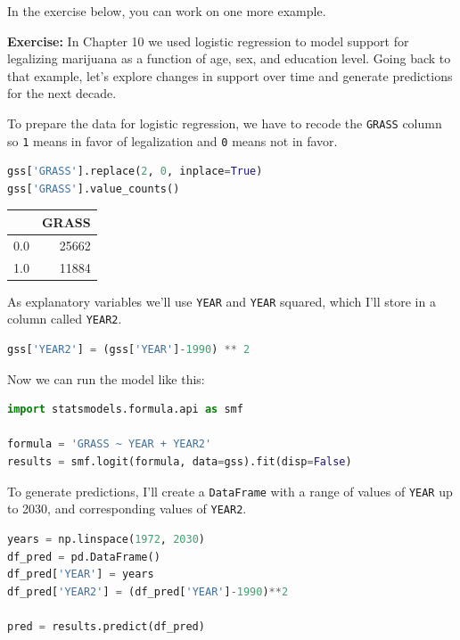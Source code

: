 In the exercise below, you can work on one more example.

\textbf{Exercise:} In Chapter 10 we used logistic regression to model
support for legalizing marijuana as a function of age, sex, and
education level. Going back to that example, let's explore changes in
support over time and generate predictions for the next decade.

To prepare the data for logistic regression, we have to recode the
\passthrough{\lstinline!GRASS!} column so \passthrough{\lstinline!1!}
means in favor of legalization and \passthrough{\lstinline!0!} means not
in favor.

\begin{lstlisting}[language=Python]
gss['GRASS'].replace(2, 0, inplace=True)
gss['GRASS'].value_counts()
\end{lstlisting}

\begin{tabular}{lr}
\toprule
{} &  GRASS \\
\midrule
0.0 &  25662 \\
1.0 &  11884 \\
\bottomrule
\end{tabular}

As explanatory variables we'll use \passthrough{\lstinline!YEAR!} and
\passthrough{\lstinline!YEAR!} squared, which I'll store in a column
called \passthrough{\lstinline!YEAR2!}.

\begin{lstlisting}[language=Python]
gss['YEAR2'] = (gss['YEAR']-1990) ** 2
\end{lstlisting}

Now we can run the model like this:

\begin{lstlisting}[language=Python]
import statsmodels.formula.api as smf

formula = 'GRASS ~ YEAR + YEAR2'
results = smf.logit(formula, data=gss).fit(disp=False)
\end{lstlisting}

To generate predictions, I'll create a
\passthrough{\lstinline!DataFrame!} with a range of values of
\passthrough{\lstinline!YEAR!} up to 2030, and corresponding values of
\passthrough{\lstinline!YEAR2!}.

\begin{lstlisting}[language=Python]
years = np.linspace(1972, 2030)
df_pred = pd.DataFrame()
df_pred['YEAR'] = years
df_pred['YEAR2'] = (df_pred['YEAR']-1990)**2

pred = results.predict(df_pred)
\end{lstlisting}

